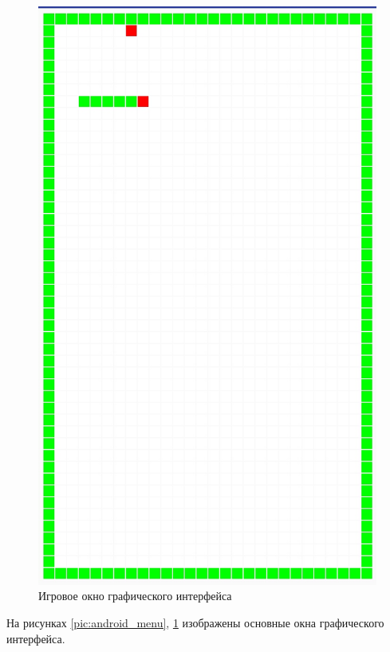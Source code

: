 \begin{figure}[H]
\begin{minipage}[h]{0.33\linewidth}
		\end{minipage}
		\hfill
		\begin{minipage}[h]{0.33\linewidth}
			\includegraphics[width=1\textwidth]{../image/GameScreen1.png}
			\caption{Игровое окно графического интерфейса}
			\label{pic:android_screen1}
		\end{minipage}
	\end{figure} 
	
	На рисунках \ref{pic:android_menu}, \ref{pic:android_screen1} изображены основные окна графического интерфейса. 
	
